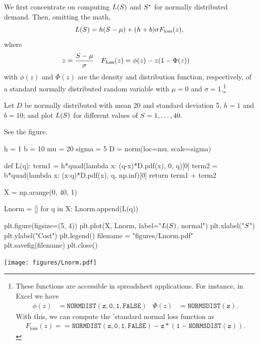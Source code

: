 We first concentrate on computing $L(S)$ and $S^*$ for normally distributed demand.  Then, omitting the math, 
\begin{equation*}
L(S)  = h(S-\mu) + (h+b) \sigma F_{\text{loss}}(z),
\end{equation*}
where 
\begin{align*}
z&=\frac{S-\mu}{\sigma} & F_{\text{loss}}(z) &= \phi(z)-z(1-\Phi(z))
\end{align*}
with $\phi(z)$ and $\Phi(z)$ are the density and distribution function, respectively, of a standard normally distributed random variable with $\mu=0$ and $\sigma=1$.\footnote{These functions are accessible in spreadsheet applications. For instance, in Excel we have 
\begin{align*}
\phi(z) &=\mathtt{NORMDIST(z,0,1,FALSE)}
&
\Phi(z) &=\mathtt{NORMSDIST(z)}.
\end{align*}
With this, we can compute the 'standard normal loss function as
\begin{align*}
F_{\text{loss}}(z) = \mathtt{=NORMDIST(z,0,1,FALSE)-z*(1-NORMSDIST(z))}.
\end{align*}
}


\begin{exercise}\label{ex:nw_stoc_norm}
Let $D$ be normally distributed with mean 20 and standard deviation 5, $h=1$ and $b=10$; and plot $L(S)$ for different values of $S=1,\ldots,40$.


\begin{solution}
See the figure.

\begin{pycode}[news]
h = 1
b = 10
mu = 20
sigma = 5 
D = norm(loc=mu, scale=sigma) 

def L(q):
    term1 = h*quad(lambda x: (q-x)*D.pdf(x), 0, q)[0]
    term2 = b*quad(lambda x: (x-q)*D.pdf(x), q, np.inf)[0]
    return term1 + term2

X = np.arange(0, 40, 1)

Lnorm = []
for q in X:
    Lnorm.append(L(q))

plt.figure(figsize=(5, 4))
plt.plot(X, Lnorm, label="$L(S)$, normal")
plt.xlabel("$S$")
plt.ylabel("Cost")
plt.legend()
filename = "figures/Lnorm.pdf"
plt.savefig(filename)
plt.close()
\end{pycode}

\begin{center}
\texttt{[image: figures/Lnorm.pdf]}
\end{center}

\end{solution}
\end{exercise}


